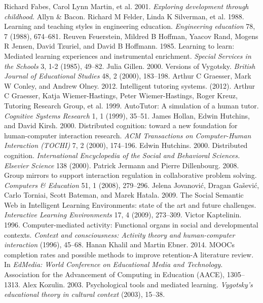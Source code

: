 \begin{multicols}{2}
\begin{thebibliography}{99}
 Richard Fabes, Carol Lynn Martin, et al. 2001. \textit{Exploring development through childhood.} Allyn \& Bacon.
 Richard M Felder, Linda K Silverman, et al. 1988. Learning and teaching styles in engineering education. \textit{Engineering education} 78, 7 (1988), 674–681.
 Reuven Feuerstein, Mildred B Hoffman, Yaacov Rand, Mogens R Jensen, David Tzuriel, and David B Hoffmann. 1985. Learning to learn: Mediated learning experiences and instrumental enrichment. \textit{Special Services in the Schools} 3, 1-2 (1985), 49–82.
 Julia Gillen. 2000. Versions of Vygotsky. \textit{British Journal of Educational Studies} 48, 2 (2000), 183–198.
 Arthur C Graesser, Mark W Conley, and Andrew Olney. 2012. Intelligent tutoring systems. (2012).
 Arthur C Graesser, Katja Wiemer-Hastings, Peter Wiemer-Hastings, Roger Kreuz, Tutoring Research Group, et al. 1999. AutoTutor: A simulation of a human tutor. \textit{Cognitive Systems Research} 1, 1 (1999), 35–51.
 James Hollan, Edwin Hutchins, and David Kirsh. 2000. Distributed cognition: toward a new foundation for human-computer interaction research. \textit{ACM Transactions on Computer-Human Interaction (TOCHI)} 7, 2 (2000), 174–196.
 Edwin Hutchins. 2000. Distributed cognition. \textit{International Encyclopedia of the Social and Behavioral Sciences. Elsevier Science} 138 (2000).
 Patrick Jermann and Pierre Dillenbourg. 2008. Group mirrors to support interaction regulation in collaborative problem solving. \textit{Computers \& Education} 51, 1 (2008), 279–296.
 Jelena Jovanović, Dragan Gašević, Carlo Torniai, Scott Bateman, and Marek Hatala. 2009. The Social Semantic Web in Intelligent Learning Environments: state of the art and future challenges. \textit{Interactive Learning Environments} 17, 4 (2009), 273–309.
 Victor Kaptelinin. 1996. Computer-mediated activity: Functional organs in social and developmental contexts. \textit{Context and consciousness: Activity theory and human-computer interaction} (1996), 45–68.
 Hanan Khalil and Martin Ebner. 2014. MOOCs completion rates and possible methods to improve retention-A literature review. In \textit{EdMedia: World Conference on Educational Media and Technology.} Association for the Advancement of Computing in Education (AACE), 1305–1313.
 Alex Kozulin. 2003. Psychological tools and mediated learning. \textit{Vygotsky's educational theory in cultural context} (2003), 15–38.

\end{thebibliography}
\end{multicols}
